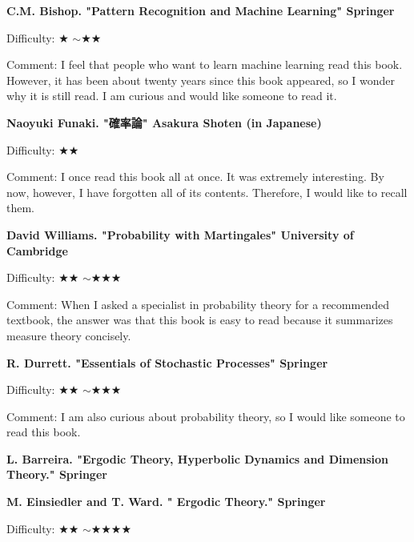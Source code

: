 \textbf{C.M. Bishop. "Pattern Recognition and Machine Learning" Springer}  　\vspace{-6pt} 

Difficulty: ★ $\sim$★★\vspace{-6pt} 

Comment: I feel that people who want to learn machine learning read this book. However, it has been about twenty years since this book appeared, so I wonder why it is still read. I am curious and would like someone to read it.
\vspace{8pt}

\textbf{Naoyuki Funaki. "確率論" Asakura Shoten (in Japanese)}  　\vspace{-6pt} 

Difficulty: ★★\vspace{-6pt} 

Comment: I once read this book all at once. It was extremely interesting. By now, however, I have forgotten all of its contents. Therefore, I would like to recall them.
\vspace{8pt}

\textbf{David Williams. "Probability with Martingales"  University of Cambridge}  　\vspace{-6pt} 

Difficulty: ★★ $\sim$★★★\vspace{-6pt} 

Comment: When I asked a specialist in probability theory for a recommended textbook, the answer was that this book is easy to read because it summarizes measure theory concisely.

\vspace{8pt}

\textbf{R. Durrett. "Essentials of Stochastic Processes" Springer}  　\vspace{-6pt} 

Difficulty: ★★ $\sim$★★★\vspace{-6pt} 

Comment: I am also curious about probability theory, so I would like someone to read this book.
\vspace{8pt}

\textbf{L. Barreira. "Ergodic Theory, Hyperbolic Dynamics and Dimension Theory." Springer}　\vspace{-6pt} 

\textbf{M. Einsiedler and T. Ward. " Ergodic Theory." Springer }  　\vspace{-6pt} 

Difficulty: ★★ $\sim$★★★★\vspace{-6pt} 

